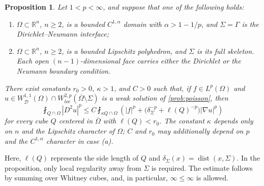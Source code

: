 \documentclass[12pt]{amsart}
\newtheorem{proposition}[theorem]{Proposition}
\newtheorem{assumption}[theorem]{Assumption}
\newtheorem{remark}[theorem]{Remark}
\numberwithin{equation}{section}
\newcommand{\bR}{\mathbb{R}}
\newcommand\cD{\mathcal{D}}
\newcommand{\p}{\partial}
\begin{document}


\begin{proposition}
 \label{prop:weighted-Whitney}
Let $1<p<\infty$, and suppose that one of the following holds:
\begin{enumerate}
    \item $\Omega\subset\bR^n$, $n\geq2$, is a bounded $C^{1,\alpha}$ domain with $\alpha>1-1/p$, and $\Sigma=\Gamma$ is the Dirichlet--Neumann interface;
    \item $\Omega\subset\bR^n$, $n\geq2$, is a bounded Lipschitz polyhedron, and $\Sigma$ is its full skeleton. Each open $(n-1)$-dimensional face carries either the Dirichlet or the Neumann boundary condition.
\end{enumerate}
There exist constants $r_0>0$, $\kappa>1$, and $C>0$ such that, if $f\in L^p(\Omega)$ and $u\in W^{1,1}_\cD(\Omega) \cap W^{2,p}_{loc}(\overline\Omega \setminus \Sigma)$ is a weak solution of \eqref{prob:poisson}, then
\begin{equation}
\label{eq:weighted-Whitney}
    \fint_{Q\cap\Omega}|D^2u|^p
    \leq C\fint_{\kappa Q\cap\Omega}
    \left(
        |f|^p+
        \bigl(\delta_\Sigma^{-p}+\ell(Q)^{-p}\bigr)
        |\nabla u|^p
    \right)
\end{equation}
for every cube $Q$ centered in $\overline{\Omega}$ with $\ell(Q)<r_0$.  The constant $\kappa$ depends only on $n$ and the Lipschitz character of $\Omega$; $C$ and $r_0$ may additionally depend on $p$ and the $C^{1,\alpha}$ character in case (a).
\end{proposition}
Here, $\ell(Q)$ represents the side length of $Q$ and $\delta_\Sigma(x) = \operatorname{dist}(x,\Sigma)$.
In the proposition, only local regularity away from $\Sigma$ is required. The estimate follows by summing over Whitney cubes, and, in particular, $\infty \leq \infty$ is allowed.
\end{document}
